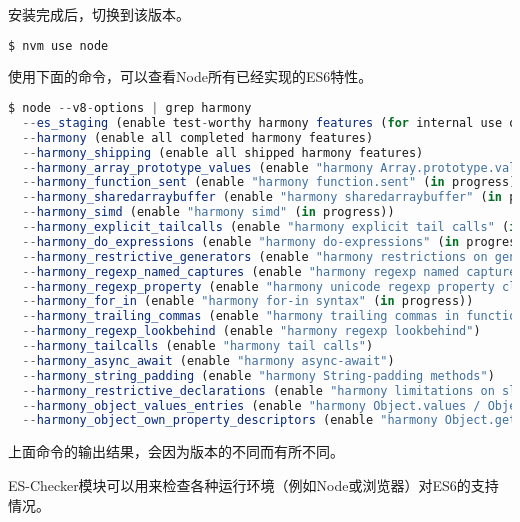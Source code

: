 安装完成后，切换到该版本。


\begin{lstlisting}[language=JavaScript]
$ nvm use node
\end{lstlisting}

使用下面的命令，可以查看Node所有已经实现的ES6特性。


\begin{lstlisting}[language=JavaScript]
$ node --v8-options | grep harmony
  --es_staging (enable test-worthy harmony features (for internal use only))
  --harmony (enable all completed harmony features)
  --harmony_shipping (enable all shipped harmony features)
  --harmony_array_prototype_values (enable "harmony Array.prototype.values" (in progress))
  --harmony_function_sent (enable "harmony function.sent" (in progress))
  --harmony_sharedarraybuffer (enable "harmony sharedarraybuffer" (in progress))
  --harmony_simd (enable "harmony simd" (in progress))
  --harmony_explicit_tailcalls (enable "harmony explicit tail calls" (in progress))
  --harmony_do_expressions (enable "harmony do-expressions" (in progress))
  --harmony_restrictive_generators (enable "harmony restrictions on generator declarations" (in progress))
  --harmony_regexp_named_captures (enable "harmony regexp named captures" (in progress))
  --harmony_regexp_property (enable "harmony unicode regexp property classes" (in progress))
  --harmony_for_in (enable "harmony for-in syntax" (in progress))
  --harmony_trailing_commas (enable "harmony trailing commas in function parameter lists" (in progress))
  --harmony_regexp_lookbehind (enable "harmony regexp lookbehind")
  --harmony_tailcalls (enable "harmony tail calls")
  --harmony_async_await (enable "harmony async-await")
  --harmony_string_padding (enable "harmony String-padding methods")
  --harmony_restrictive_declarations (enable "harmony limitations on sloppy mode function declarations")
  --harmony_object_values_entries (enable "harmony Object.values / Object.entries")
  --harmony_object_own_property_descriptors (enable "harmony Object.getOwnPropertyDescriptors()")
\end{lstlisting}

上面命令的输出结果，会因为版本的不同而有所不同。


ES-Checker模块可以用来检查各种运行环境（例如Node或浏览器）对ES6的支持情况。


